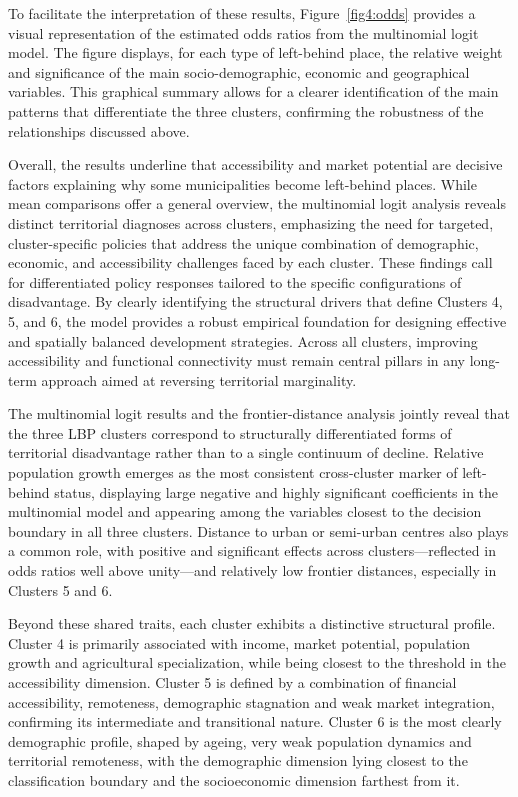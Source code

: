 \documentclass[a4paper,11pt,oneside]{article}
\begin{document}
To facilitate the interpretation of these results, Figure~\ref{fig4:odds} provides a visual representation of the estimated odds ratios from the multinomial logit model. The figure displays, for each type of left-behind place, the relative weight and significance of the main socio-demographic, economic and geographical variables. This graphical summary allows for a clearer identification of the main patterns that differentiate the three clusters, confirming the robustness of the relationships discussed above.

Overall, the results underline that accessibility and market potential are decisive factors explaining why some municipalities become left-behind places. While mean comparisons offer a general overview, the multinomial logit analysis reveals distinct territorial diagnoses across clusters, emphasizing the need for targeted, cluster-specific policies that address the unique combination of demographic, economic, and accessibility challenges faced by each cluster. These findings call for differentiated policy responses tailored to the specific configurations of disadvantage. By clearly identifying the structural drivers that define Clusters 4, 5, and 6, the model provides a robust empirical foundation for designing effective and spatially balanced development strategies. Across all clusters, improving accessibility and functional connectivity must remain central pillars in any long-term approach aimed at reversing territorial marginality.

The multinomial logit results and the frontier-distance analysis jointly reveal that the three LBP clusters correspond to structurally differentiated forms of territorial disadvantage rather than to a single continuum of decline. Relative population growth emerges as the most consistent cross-cluster marker of left-behind status, displaying large negative and highly significant coefficients in the multinomial model and appearing among the variables closest to the decision boundary in all three clusters. Distance to urban or semi-urban centres also plays a common role, with positive and significant effects across clusters---reflected in odds ratios well above unity---and relatively low frontier distances, especially in Clusters 5 and 6.

Beyond these shared traits, each cluster exhibits a distinctive structural profile. Cluster 4 is primarily associated with income, market potential, population growth and agricultural specialization, while being closest to the threshold in the accessibility dimension. Cluster 5 is defined by a combination of financial accessibility, remoteness, demographic stagnation and weak market integration, confirming its intermediate and transitional nature. Cluster 6 is the most clearly demographic profile, shaped by ageing, very weak population dynamics and territorial remoteness, with the demographic dimension lying closest to the classification boundary and the socioeconomic dimension farthest from it.
\end{document}
